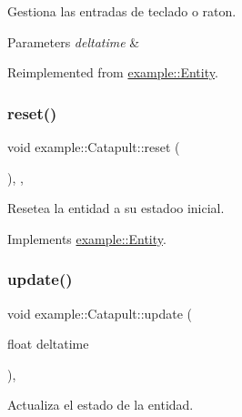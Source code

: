 Gestiona las entradas de teclado o raton. 


\begin{DoxyParams}{Parameters}
{\em deltatime} & \\
\hline
\end{DoxyParams}


Reimplemented from \mbox{\hyperlink{classexample_1_1_entity_a8e2ffc6208151f9d60b7c98d04f12de2}{example\+::\+Entity}}.

\mbox{\label{classexample_1_1_catapult_acbef58b1295f5ddfedd45d92bd6fbfcf}} 
\subsubsection{\texorpdfstring{reset()}{reset()}}
{\footnotesize\ttfamily void example\+::\+Catapult\+::reset (\begin{DoxyParamCaption}{ }\end{DoxyParamCaption})\hspace{0.3cm}{\ttfamily [inline]}, {\ttfamily [override]}, {\ttfamily [virtual]}}



Resetea la entidad a su estadoo inicial. 



Implements \mbox{\hyperlink{classexample_1_1_entity_a38eec21167e85013a5e89a9131458bfa}{example\+::\+Entity}}.

\mbox{\label{classexample_1_1_catapult_a92d07b886ef107a18037b53476c27f69}} 
\subsubsection{\texorpdfstring{update()}{update()}}
{\footnotesize\ttfamily void example\+::\+Catapult\+::update (\begin{DoxyParamCaption}\item[{float}]{deltatime }\end{DoxyParamCaption})\hspace{0.3cm}{\ttfamily [override]}, {\ttfamily [virtual]}}



Actualiza el estado de la entidad. 


